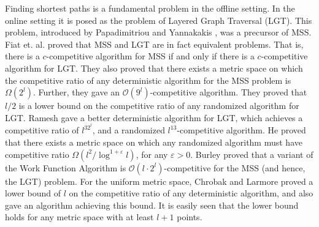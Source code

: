 \documentclass[11pt]{article}
\theoremstyle{plain}\newtheorem{theorem}{Theorem}
\theoremstyle{definition}
\theoremstyle{remark}
\begin{document}
Finding shortest paths is a fundamental problem in the offline setting. In the online setting it is posed as the problem of Layered Graph Traversal (LGT). This problem, introduced by Papadimitriou and Yannakakis \cite{PapadimitriouY91}, was a precursor of MSS. Fiat et. al. \cite{FiatFKRRV98} proved that MSS and LGT are in fact equivalent problems. That is, there is a $c$-competitive algorithm for MSS if and only if there is a $c$-competitive algorithm for LGT. They also proved that there exists a metric space on which the competitive ratio of any deterministic algorithm for the MSS problem is $\Omega(2^l)$.
Further, they gave an $\mathcal{O}(9^l)$-competitive algorithm. They proved that $l/2$ is a lower bound on the competitive ratio of any randomized algorithm for LGT. Ramesh \cite{Ramesh95} gave a better deterministic algorithm for LGT, which achieves a competitive ratio of $l^32^l$, and a randomized $l^{13}$-competitive algorithm. He proved that there exists a metric space on which any randomized algorithm must have competitive ratio $\Omega(l^2/\log^{1+\varepsilon}l)$, for any $\varepsilon>0$. Burley \cite{Burley96} proved that a variant of the Work Function Algorithm is $\mathcal{O}(l\cdot2^l)$-competitive for the MSS (and hence, the LGT) problem. For the uniform metric space, Chrobak and Larmore \cite{ChrobakL93} proved a lower bound of $l$ on the competitive ratio of any deterministic algorithm, and also gave an algorithm achieving this bound. It is easily seen that the lower bound holds for any metric space with at least $l+1$ points.
\end{document}
